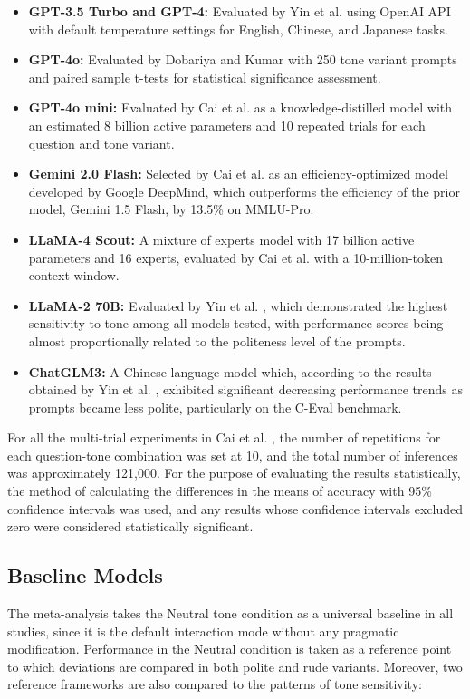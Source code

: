 \documentclass[conference]{IEEEtran}
\begin{document}
\begin{itemize}
\item \textbf{GPT-3.5 Turbo and GPT-4:} Evaluated by Yin et al. \cite{b6} using OpenAI API with default temperature settings for English, Chinese, and Japanese tasks.
\item \textbf{GPT-4o:} Evaluated by Dobariya and Kumar \cite{b7} with 250 tone variant prompts and paired sample t-tests for statistical significance assessment.
\item \textbf{GPT-4o mini:} Evaluated by Cai et al. \cite{b8} as a knowledge-distilled model with an estimated 8 billion active parameters and 10 repeated trials for each question and tone variant.
\item \textbf{Gemini 2.0 Flash:} Selected by Cai et al. \cite{b8} as an efficiency-optimized model developed by Google DeepMind, which outperforms the efficiency of the prior model, Gemini 1.5 Flash, by 13.5\% on MMLU-Pro.
\item \textbf{LLaMA-4 Scout:} A mixture of experts model with 17 billion active parameters and 16 experts, evaluated by Cai et al. \cite{b8} with a 10-million-token context window.
\item \textbf{LLaMA-2 70B:} Evaluated by Yin et al. \cite{b6}, which demonstrated the highest sensitivity to tone among all models tested, with performance scores being almost proportionally related to the politeness level of the prompts.
\item \textbf{ChatGLM3:} A Chinese language model which, according to the results obtained by Yin et al. \cite{b6}, exhibited significant decreasing performance trends as prompts became less polite, particularly on the C-Eval benchmark.
\end{itemize}

For all the multi-trial experiments in Cai et al. \cite{b8}, the number of repetitions for each question-tone combination was set at 10, and the total number of inferences was approximately 121,000. For the purpose of evaluating the results statistically, the method of calculating the differences in the means of accuracy with 95\% confidence intervals was used, and any results whose confidence intervals excluded zero were considered statistically significant.

\subsection{Baseline Models}

The meta-analysis takes the Neutral tone condition as a universal baseline in all studies, since it is the default interaction mode without any pragmatic modification. Performance in the Neutral condition is taken as a reference point to which deviations are compared in both polite and rude variants. Moreover, two reference frameworks are also compared to the patterns of tone sensitivity:
\end{document}

